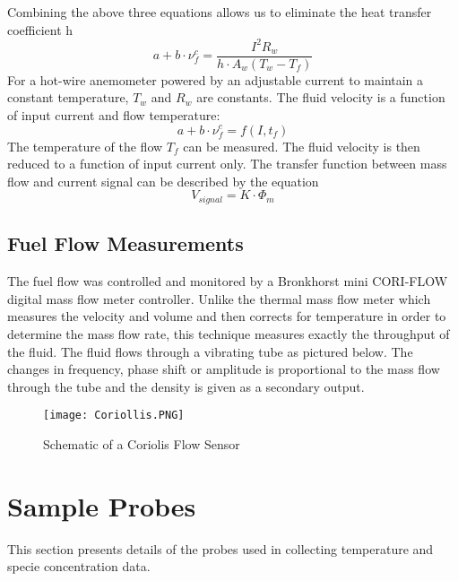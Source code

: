Combining the above three equations allows us to eliminate the heat transfer coefficient h
\begin{equation}
a + b\cdot \nu^c_f = \frac{I^2R_w}{h\cdot A_w\left ( T_w - T_f \right )}
\label{Ch_5_03}
\end{equation}
For a hot-wire anemometer powered by an adjustable current to maintain a constant temperature, $T_w$ and $R_w$ are constants. The fluid velocity is a function of input current and flow temperature:
\begin{equation}
a + b\cdot \nu^c_f = f\left ( I,t_f \right )
\label{Ch_5_04}
\end{equation}
The temperature of the flow $T_f$ can be measured. The fluid velocity is then reduced to a function of input current only. The transfer function between mass flow and current signal can be described by the equation
\begin{equation}
V_{signal} = K\cdot\Phi_m
\label{Ch_5_04}
\end{equation}
\subsection{Fuel Flow Measurements}
The fuel flow was controlled and monitored by a Bronkhorst mini CORI-FLOW digital mass flow meter controller. Unlike the thermal mass flow meter which measures the velocity and volume and then corrects for temperature in order to determine the mass flow rate, this technique measures exactly the throughput of the fluid. The fluid flows through a vibrating tube as pictured below. The changes in frequency, phase shift or amplitude is proportional to the mass flow through the tube and the density is given as a secondary output.
 \begin{figure}[h!]
    \centering
        \texttt{[image: Coriollis.PNG]}
        \caption{Schematic of a Coriolis Flow Sensor}
    \label{f:FlowMeter}
\end{figure}
\section{Sample Probes}
This section presents details of the probes used in collecting temperature and specie concentration data.
